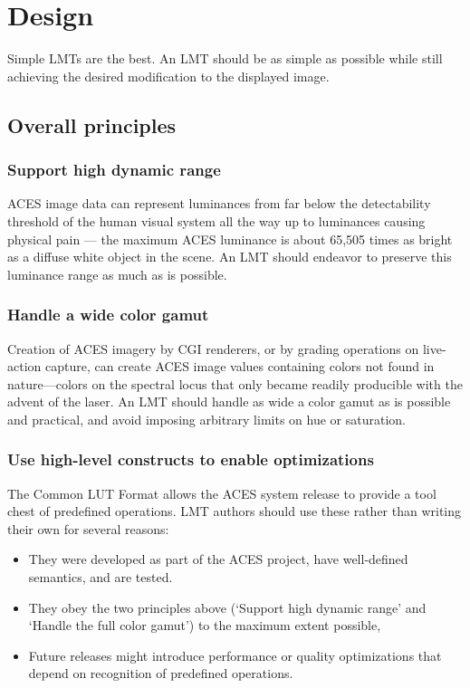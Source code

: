 \regularsectionformat	%
\chapter{Design}

Simple LMTs are the best. An LMT should be as simple as possible while still achieving the desired modification to the displayed image.

\section{Overall principles}

\subsection{Support high dynamic range}
ACES image data can represent luminances from far below the detectability threshold of the human visual system all the way up to luminances causing physical pain — the maximum ACES luminance is about 65,505 times as bright as a diffuse white object in the scene. An LMT should endeavor to preserve this luminance range as much as is possible. 

\subsection{Handle a wide color gamut}
Creation of ACES imagery by CGI renderers, or by grading operations on live-action capture, can create ACES image values containing colors not found in nature—colors on the spectral locus that only became readily producible with the advent of the laser. An LMT should handle as wide a color gamut as is possible and practical, and avoid imposing arbitrary limits on hue or saturation. 

\subsection{Use high-level constructs to enable optimizations}
The Common LUT Format allows the ACES system release to provide a tool chest of predefined operations. LMT authors should use these rather than writing their own for several reasons:

\begin{itemize}
    \item   They were developed as part of the ACES project, have well-defined semantics, and are tested.
    \item   They obey the two principles above (‘Support high dynamic range’ and ‘Handle the full color gamut’) to the maximum extent possible,
    \item   Future releases might introduce performance or quality optimizations that depend on recognition of predefined operations.
\end{itemize}

